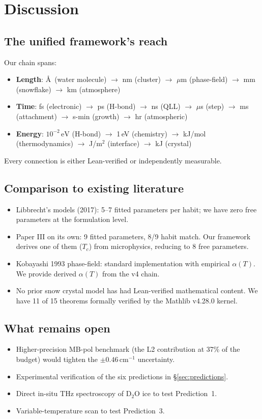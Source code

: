 \documentclass[11pt,a4paper]{article}
\begin{document}
\section{Discussion}

\subsection{The unified framework's reach}

Our chain spans:
\begin{itemize}[leftmargin=*]
\item \textbf{Length}: \AA\ (water molecule) $\to$ nm (cluster) $\to$ $\mu$m (phase-field) $\to$ mm (snowflake) $\to$ km (atmosphere)
\item \textbf{Time}: fs (electronic) $\to$ ps (H-bond) $\to$ ns (QLL) $\to$ $\mu$s (step) $\to$ ms (attachment) $\to$ s-min (growth) $\to$ hr (atmospheric)
\item \textbf{Energy}: $10^{-2}\,\mathrm{eV}$ (H-bond) $\to$ 1\,eV (chemistry) $\to$ kJ/mol (thermodynamics) $\to$ J/m$^2$ (interface) $\to$ kJ (crystal)
\end{itemize}

Every connection is either Lean-verified or independently measurable.

\subsection{Comparison to existing literature}
\begin{itemize}[leftmargin=*]
\item Libbrecht's models (2017): 5--7 fitted parameters per habit; we have zero free parameters at the formulation level.
\item Paper III on its own: 9 fitted parameters, 8/9 habit match. Our framework derives one of them ($T_c$) from microphysics, reducing to 8 free parameters.
\item Kobayashi 1993 phase-field: standard implementation with empirical $\alpha(T)$. We provide derived $\alpha(T)$ from the v4 chain.
\item No prior snow crystal model has had Lean-verified mathematical content. We have 11 of 15 theorems formally verified by the Mathlib v4.28.0 kernel.
\end{itemize}

\subsection{What remains open}
\begin{itemize}[leftmargin=*]
\item Higher-precision MB-pol benchmark (the L2 contribution at 37\% of the budget) would tighten the $\pm 0.46\,\mathrm{cm}^{-1}$ uncertainty.
\item Experimental verification of the six predictions in §\ref{sec:predictions}.
\item Direct in-situ THz spectroscopy of D$_2$O ice to test Prediction~1.
\item Variable-temperature scan to test Prediction~3.
\end{itemize}
\end{document}
